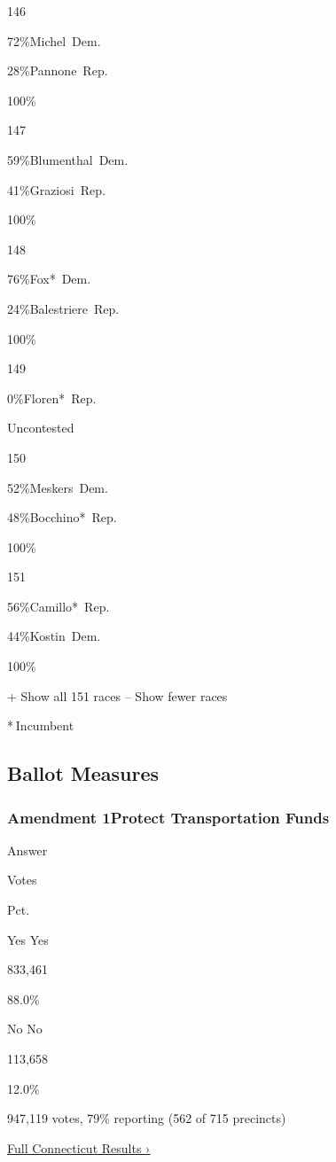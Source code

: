 146

 72\%Michel~Dem.

 28\%Pannone~Rep.

100\%

147

 59\%Blumenthal~Dem.

 41\%Graziosi~Rep.

100\%

148

 76\%Fox*~Dem.

 24\%Balestriere~Rep.

100\%

149

 0\%Floren*~Rep.

Uncontested

150

 52\%Meskers~Dem.

 48\%Bocchino*~Rep.

100\%

151

 56\%Camillo*~Rep.

 44\%Kostin~Dem.

100\%

+ Show all 151 races -- Show fewer races

* Incumbent~

\hypertarget{ballot-measures}{%
\subsection{Ballot Measures}\label{ballot-measures}}

\hypertarget{amendment-1protect-transportation-funds}{%
\subsubsection{Amendment 1Protect Transportation
Funds}\label{amendment-1protect-transportation-funds}}

Answer

Votes

Pct.

 Yes Yes

833,461

88.0\%

 No No

113,658

12.0\%

947,119 votes, 79\% reporting (562 of 715 precincts)

\href{https://www.nytimes3xbfgragh.onion/interactive/2018/11/06/us/elections/results-connecticut-elections.html}{Full
Connecticut Results ›}


